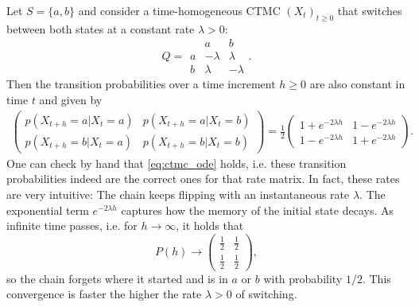 \begin{examplebox}
Let $S=\{a,b\}$ and consider a time-homogeneous CTMC $(X_t)_{t\ge 0}$ that
switches between both states at a constant rate $\lambda>0$:
\[
Q=
\begin{array}{c|cc}
 & a & b\\\hline
a & -\lambda & \lambda\\
b & \lambda & -\lambda
\end{array}.
\]
Then the transition probabilities over a time increment $h\ge 0$ are also constant in time $t$ and given by
\begin{align*}
\begin{pmatrix}
p(X_{t+h}=a|X_t=a) & p(X_{t+h}=a|X_t=b)\\
p(X_{t+h}=b|X_t=a) & p(X_{t+h}=b|X_t=b)
\end{pmatrix}
=
\frac12
\begin{pmatrix}
1+e^{-2\lambda h} & 1-e^{-2\lambda h}\\
1-e^{-2\lambda h} & 1+e^{-2\lambda h}
\end{pmatrix}.
\end{align*}
One can check by hand that \cref{eq:ctmc_ode} holds, i.e. these transition probabilities indeed are the correct ones for that rate matrix. In fact, these rates are very intuitive: The chain keeps flipping with an instantaneous rate
$\lambda$. The exponential term $e^{-2\lambda h}$
captures how the memory of the initial state decays. As infinite time passes, i.e. for $h\to\infty$, it holds that
\[
P(h)\to \begin{pmatrix}\frac12&\frac12\\\frac12&\frac12\end{pmatrix},
\]
so the chain forgets where it started and is in $a$ or $b$ with probability $1/2$. This convergence is faster the higher the rate $\lambda>0$ of switching.
\end{examplebox}

